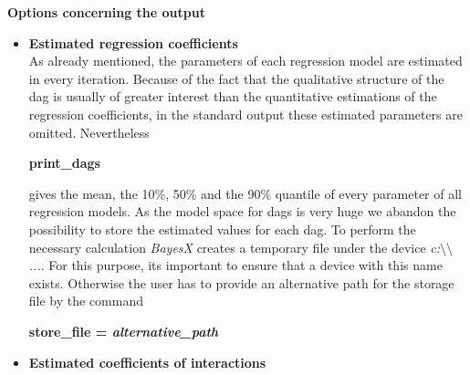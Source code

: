 {\bf Options concerning the output}
\begin{itemize}
\item {\bf Estimated regression coefficients}\\
As already mentioned, the parameters of each regression model are
estimated in every iteration. Because of the fact that the
qualitative structure of the dag is usually of greater interest
than the quantitative estimations of the regression coefficients,
in the standard output these estimated parameters are omitted.
Nevertheless
\begin{center}
{\bf print\_dags}
\end{center}
gives the mean, the 10\%, 50\% and the 90\% quantile of every
parameter of all regression models.
As the model space for dags is very huge we abandon the
possibility to store the estimated values for each dag. To perform
the necessary calculation {\em BayesX} creates a temporary file
under the device {\em c:$\setminus\setminus$...}. For this
purpose, its important to ensure that a device with this name
exists. Otherwise the user has to provide an alternative path for
the storage file by the command
\begin{center}
{\bf store\_file = {\em alternative\_path}}
\end{center}
\item {\bf Estimated coefficients of interactions}
\end{itemize}

